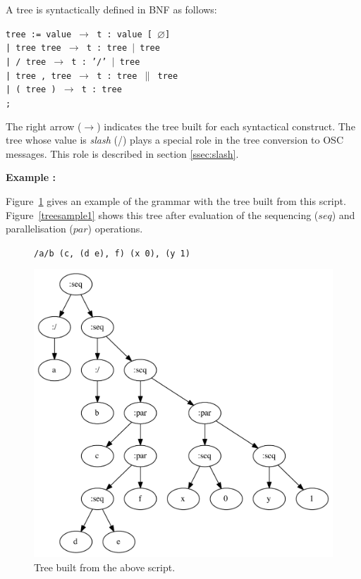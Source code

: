 \documentclass{article}
\newcommand{\exemple}	{\vspace*{1mm}\hspace*{-4mm}\textbf{Example :}}
\newcommand{\code}	[2][0.9]		{\vspace{0mm}\begin{center}\colorbox{mygrey}{
							\begin{minipage}[t]{#1\columnwidth} 
							{\small \texttt{#2}}
							\end{minipage}}\end{center}}
\newcommand{\nulltree}	{\ensuremath{\varnothing}}
\newcommand{\seq}		{\ensuremath{|}}
\newcommand{\paral}		{\ensuremath{\parallel}}
\newcommand{\ula}		{\hspace*{8mm}}
\begin{document}
A tree is syntactically defined in BNF as follows:
\code{tree := value      \hspace*{8mm} $\to$ t : value [ \nulltree ] \\
\ula | tree tree         \hspace*{4mm} $\to$ t : tree \seq\ tree \\
\ula | / tree            \hspace*{9.7mm} $\to$ t : '/' \seq\ tree\\
\ula | tree , tree       \hspace*{0mm}  $\to$ t : tree \paral\ tree \\
\ula | ( tree )          \hspace*{6mm} $\to$ t : tree \\
\ula ;\\
}
The right arrow ($\to$) indicates the tree built for each syntactical construct. 
The tree whose value is \emph{slash} (/) plays a special role in the tree conversion to OSC messages. This role is described in section \ref{ssec:slash}.

\exemple

Figure~\ref{parsesample1} gives an example of the grammar with the tree built from this script. Figure~\ref{treesample1} shows this tree after evaluation of the sequencing ($seq$) and parallelisation ($par$) operations.

\begin{figure}[htbp]
\code{/a/b (c, (d e), f) (x 0), (y 1)}
\begin{center}
\includegraphics[width=1.0\columnwidth]{parse/sample1}
\caption{Tree built from the above script.}
\label{parsesample1}
\end{center}
\end{figure}
\end{document}
